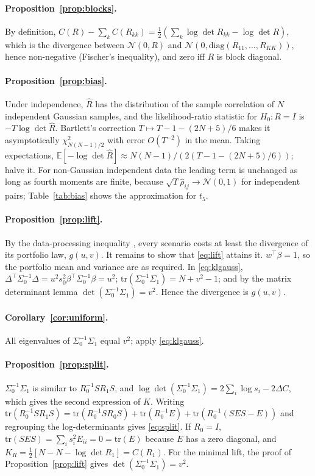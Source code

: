 \documentclass[12pt]{article}
\theoremstyle{definition}
\theoremstyle{remark}
\newcommand{\E}{\mathbb{E}}
\begin{document}
\begin{doublespace}
\paragraph{Proposition~\ref{prop:blocks}.} By definition,
$C(R)-\sum_kC(R_{kk})=\tfrac12(\sum_k\log\det R_{kk}-\log\det R)$, which is
the divergence between $\mathcal N(0,R)$ and $\mathcal N(0,\mathrm{diag}(R_{11},
\dots,R_{KK}))$, hence non-negative (Fischer's inequality), and zero iff $R$ is
block diagonal.

\paragraph{Proposition~\ref{prop:bias}.} Under independence, $\hat R$ has the
distribution of the sample correlation of $N$ independent Gaussian samples, and
the likelihood-ratio statistic for $H_0:R=I$ is $-T\log\det\hat R$. Bartlett's
correction $T\mapsto T-1-(2N+5)/6$ makes it asymptotically
$\chi^2_{N(N-1)/2}$ with error $O(T^{-2})$ in the mean. Taking expectations,
$\E[-\log\det\hat R]\approx N(N-1)/(2(T-1-(2N+5)/6))$; halve it. For
non-Gaussian independent data the leading term is unchanged as long as fourth
moments are finite, because $\sqrt T\hat\rho_{ij}\to\mathcal N(0,1)$ for
independent pairs; Table~\ref{tab:bias} shows the approximation for $t_5$.

\paragraph{Proposition~\ref{prop:lift}.} By the data-processing inequality
\citep[ch.~2]{cover2006}, every scenario costs at least the divergence of its
portfolio law, $g(u,v)$. It remains to show that \eqref{eq:lift} attains it.
$w^\top\beta=1$, so the portfolio mean and variance are as required. In
\eqref{eq:klgauss}, $\Delta^\top\Sigma_0^{-1}\Delta=u^2s_0^2\beta^\top
\Sigma_0^{-1}\beta=u^2$; $\mathrm{tr}(\Sigma_0^{-1}\Sigma_1)=N+v^2-1$; and by the
matrix determinant lemma $\det(\Sigma_0^{-1}\Sigma_1)=v^2$. Hence the
divergence is $g(u,v)$.

\paragraph{Corollary~\ref{cor:uniform}.} All eigenvalues of
$\Sigma_0^{-1}\Sigma_1$ equal $v^2$; apply \eqref{eq:klgauss}.

\paragraph{Proposition~\ref{prop:split}.} $\Sigma_0^{-1}\Sigma_1$ is similar to
$R_0^{-1}SR_1S$, and $\log\det(\Sigma_0^{-1}\Sigma_1)=2\sum_i\log s_i
-2\Delta C$, which gives the second expression of $K$. Writing
$\mathrm{tr}(R_0^{-1}SR_1S)=\mathrm{tr}(R_0^{-1}SR_0S)+\mathrm{tr}(R_0^{-1}E)
+\mathrm{tr}(R_0^{-1}(SES-E))$ and regrouping the log-determinants gives
\eqref{eq:split}. If $R_0=I$, $\mathrm{tr}(SES)=\sum_is_i^2E_{ii}=0=
\mathrm{tr}(E)$ because $E$ has a zero diagonal, and $K_R=\tfrac12[N-N-
\log\det R_1]=C(R_1)$. For the minimal lift, the proof of
Proposition~\ref{prop:lift} gives $\det(\Sigma_0^{-1}\Sigma_1)=v^2$.


\end{doublespace}
\end{document}

